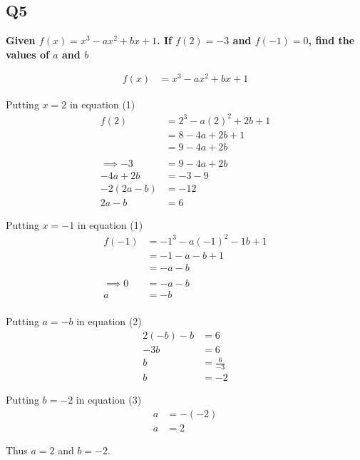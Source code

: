 \documentclass[crop=false,fleqn]{standalone}
\begin{document}
    \subsection*{Q5}
    \textbf{Given $f(x)=x^3-ax^2+bx+1$. If $f(2)=-3$ and $f(-1)=0$, find the values of $a$ and $b$}

    \begin{align*}
        f(x) &= x^3 - ax^2 + bx + 1 \tag{1}
    \end{align*}

    Putting $x = 2$ in equation (1)
    \begin{align*}
        f(2) &= 2^3 - a(2)^2 + 2b + 1 \\
            &= 8 - 4a + 2b + 1 \\
            &= 9 - 4a + 2b \\
        \\
        \implies -3 &= 9 - 4a + 2b \tag{As $f(2) = -3$} \\
            -4a + 2b &= -3 -9 \tag{By Rearranging} \\
            -2(2a - b) &= -12 \\
            2a - b &= 6 \tag{2}
    \end{align*}



    Putting $x = -1$ in equation (1)
    \begin{align*}
        f(-1) &= -1^3 - a(-1)^2 - 1b + 1 \\
            &= -1 - a - b + 1 \\
            &= -a -b \\
        \\
        \implies 0 &= -a -b \tag{As $f(-1) = 0$} \\
            a &= -b \tag{3} \\
    \end{align*}

    Putting $a = -b$ in equation (2)
    \begin{align*}
        2(-b) -b &= 6 \\
        -3b &= 6 \\
        b &= \frac{6}{-3} \\
        b &= -2
    \end{align*}

    Putting $b = -2$ in equation (3)
    \begin{align*}
        a &= - (-2) \\
        a &= 2
    \end{align*}

    Thus $a=2$ and $b=-2$.
\end{document}
